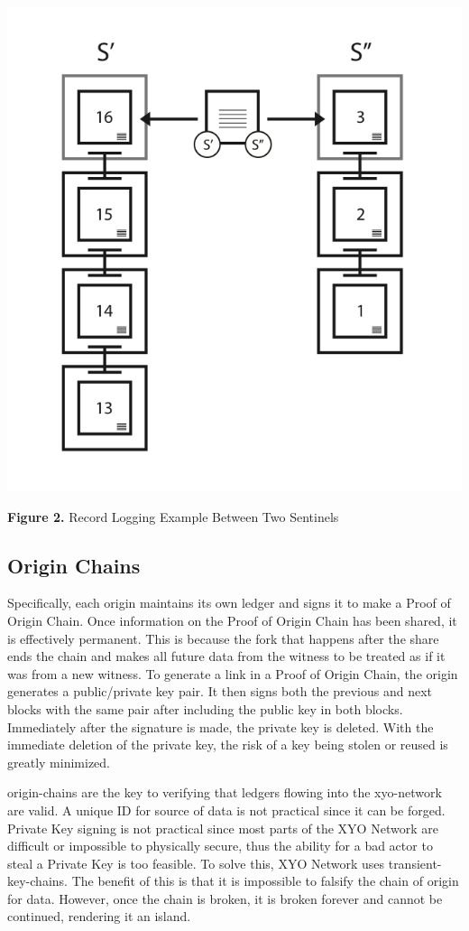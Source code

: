 \documentclass{article}
\begin{document}
\includegraphics [width=\textwidth]{boundwitness}
\begin{center}\textbf{Figure 2.}  Record Logging Example Between Two Sentinels
\end{center}

\subsection{Origin Chains}

Specifically, each origin maintains its own ledger and signs it to make a Proof of Origin Chain. Once information on the Proof of Origin Chain has been shared, it is effectively permanent. This is because the fork that happens after the share ends the chain and makes all future data from the witness to be treated as if it was from a new witness. To generate a link in a Proof of Origin Chain, the origin generates a public/private key pair. It then signs both the previous and next blocks with the same pair after including the public key in both blocks. Immediately after the signature is made, the private key is deleted. With the immediate deletion of the private key, the risk of a key being stolen or reused is greatly minimized.

\Glspl{origin-chain} are the key to verifying that ledgers flowing into the \Gls{xyo-network} are valid. A unique ID for source of data is not practical since it can be forged. Private Key signing is not practical since most parts of the XYO Network are difficult or impossible to physically secure, thus the ability for a bad actor to steal a Private Key is too feasible. To solve this, XYO Network uses \Glspl{transient-key-chain}. The benefit of this is that it is impossible to falsify the chain of origin for data. However, once the chain is broken, it is broken forever and cannot be continued, rendering it an island.
\end{document}
